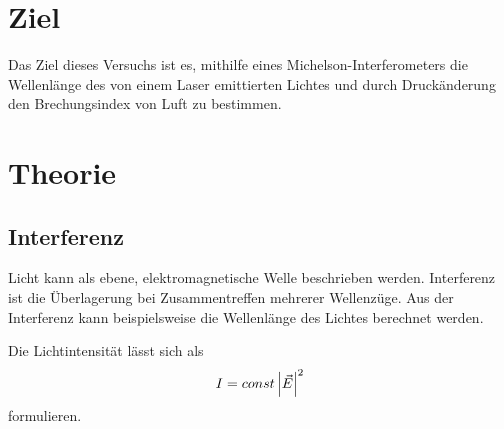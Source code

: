 \section{Ziel}
Das Ziel dieses Versuchs ist es, mithilfe eines Michelson-Interferometers die Wellenlänge des von einem Laser emittierten Lichtes und durch Druckänderung den Brechungsindex von Luft zu bestimmen.

\section{Theorie}
\label{sec:Theorie}

\subsection{Interferenz}
Licht kann als ebene, elektromagnetische Welle beschrieben werden.
Interferenz ist die Überlagerung bei Zusammentreffen mehrerer Wellenzüge.
Aus der Interferenz kann beispielsweise die Wellenlänge des Lichtes berechnet werden.



\noindent Die Lichtintensität lässt sich als
\begin{equation}
    I = const \, \abs{\vec{E}}^{2}
    \label{eqn:intensität}
\end{equation} 
formulieren.

